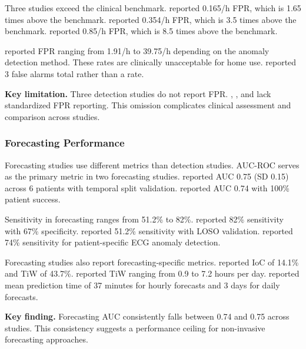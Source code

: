 Three studies exceed the clinical benchmark. \textcite{dongTwoLayerEnsembleMethod2022} reported 0.165/h FPR, which is 1.65 times above the benchmark. \textcite{wangEpilepticSeizureDetection2025} reported 0.354/h FPR, which is 3.5 times above the benchmark. \textcite{odeDevelopmentEpilepticSeizure2023} reported 0.85/h FPR, which is 8.5 times above the benchmark.

\textcite{reintjesECGBasedDetectionEpileptic2025} reported FPR ranging from 1.91/h to 39.75/h depending on the anomaly detection method. These rates are clinically unacceptable for home use. \textcite{borujenyDetectionEpilepticSeizure2013} reported 3 false alarms total rather than a rate.

\textbf{Key limitation.} Three detection studies do not report FPR. \textcite{singhrathoreDevelopmentMultimodalMachine2024}, \textcite{elemamAutomatedValidatedTool2025}, and \textcite{borujenyDetectionEpilepticSeizure2013} lack standardized FPR reporting. This omission complicates clinical assessment and comparison across studies.

\subsubsection{Forecasting Performance}

Forecasting studies use different metrics than detection studies. AUC-ROC serves as the primary metric in two forecasting studies. \textcite{nasseriAmbulatorySeizureForecasting2021} reported AUC 0.75 (SD 0.15) across 6 patients with temporal split validation. \textcite{stirlingForecastingSeizureLikelihood2021} reported AUC 0.74 with 100\% patient success.

Sensitivity in forecasting ranges from 51.2\% to 82\%. \textcite{vielufSeizureMonitoringCombined2025} reported 82\% sensitivity with 67\% specificity. \textcite{meiselMachineLearningWristband2020} reported 51.2\% sensitivity with LOSO validation. \textcite{odeDevelopmentEpilepticSeizure2023} reported 74\% sensitivity for patient-specific ECG anomaly detection.

Forecasting studies also report forecasting-specific metrics. \textcite{meiselMachineLearningWristband2020} reported IoC of 14.1\% and TiW of 43.7\%. \textcite{nasseriAmbulatorySeizureForecasting2021} reported TiW ranging from 0.9 to 7.2 hours per day. \textcite{stirlingForecastingSeizureLikelihood2021} reported mean prediction time of 37 minutes for hourly forecasts and 3 days for daily forecasts.

\textbf{Key finding.} Forecasting AUC consistently falls between 0.74 and 0.75 across studies. This consistency suggests a performance ceiling for non-invasive forecasting approaches.

